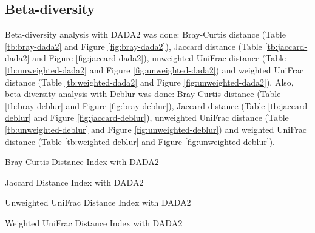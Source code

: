 \documentclass[a4paper]{article}
\begin{document}
        \subsection{Beta-diversity}
            Beta-diversity analysis with DADA2 was done: Bray-Curtis distance (Table \ref{tb:bray-dada2} and Figure \ref{fig:bray-dada2}), Jaccard distance (Table \ref{tb:jaccard-dada2} and Figure \ref{fig:jaccard-dada2}), unweighted UniFrac distance (Table \ref{tb:unweighted-dada2} and Figure \ref{fig:unweighted-dada2}) and weighted UniFrac distance (Table \ref{tb:weighted-dada2} and Figure \ref{fig:unweighted-dada2}). Also, beta-diversity analysis with Deblur was done: Bray-Curtis distance (Table \ref{tb:bray-deblur} and Figure \ref{fig:bray-deblur}), Jaccard distance (Table \ref{tb:jaccard-deblur} and Figure \ref{fig:jaccard-deblur}), unweighted UniFrac distance (Table \ref{tb:unweighted-deblur} and Figure \ref{fig:unweighted-deblur}) and weighted UniFrac distance (Table \ref{tb:weighted-deblur} and Figure \ref{fig:unweighted-deblur}).

            \begin{table}[p]
                \centering
                \caption{Bray-Curtis Distance Index with DADA2}
                \label{tb:bray-dada2}
            \end{table}

            \begin{table}[p]
                \centering
                \caption{Jaccard Distance Index with DADA2}
                \label{tb:jaccard-dada2}
            \end{table}

            \begin{table}[p]
                \centering
                \caption{Unweighted UniFrac Distance Index with DADA2}
                \label{tb:unweighted-dada2}
            \end{table}

            \begin{table}[p]
                \centering
                \caption{Weighted UniFrac Distance Index with DADA2}
                \label{tb:weighted-dada2}
            \end{table}
\end{document}

